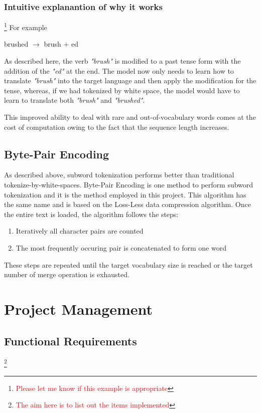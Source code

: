 \documentclass[12pt,a4paper,twoside,openright]{report}
\newcommand{\red}[1]{\textcolor{red}{#1}}
\newcommand{\changedFont}[1]{{\fontfamily{qcr}\selectfont #1}}
\begin{document}
\subsubsection{Intuitive explanantion of why it works}\footnote{\red{Please let me know if this example is appropriate}}
For example \\
\begin{center}
    \changedFont{brushed} $\longrightarrow$ \changedFont{brush $+$ ed}
\end{center}
As described here, the verb \textit{"brush"} is modified to a past tense form with the addition of the \textit{"ed"} at the end. The model now only needs to learn how to translate \textit{"brush"} into the target language and then apply the modification for the tense, whereas, if we had tokenized by white space, the model would have to learn to translate both \textit{"brush"} and \textit{"brushed"}.

This improved ability to deal with rare and out-of-vocabulary words comes at the cost of computation owing to the fact that the sequence length increases.

\subsection{Byte-Pair Encoding}
\label{bpe}
As described above, subword tokenization performs better than traditional tokenize-by-white-spaces. Byte-Pair Encoding is one method to perform subword tokenization and it is the method employed in this project. This algorithm has the same name and is based on the Loss-Less data compression algorithm. Once the entire text is loaded, the algorithm follows the steps:
\begin{enumerate}
    \item Iteratively all character pairs are counted
    \item The most frequently occuring pair is concatenated to form one word
\end{enumerate}
These steps are repeated until the target vocabulary size is reached or the target number of merge operation is exhausted.

\section{Project Management}
\label{project-management}


\subsection{Functional Requirements}\footnote{\red{The aim here is to list out the items implemented}}
\label{functional-requirements}
\end{document}
